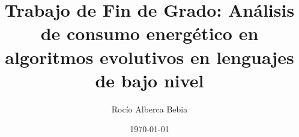 \documentclass[a4paper,12pt]{book}
\begin{document}
\title{Trabajo de Fin de Grado: Análisis de consumo energético en algoritmos evolutivos en lenguajes de bajo nivel}
\author{Rocío Alberca Bebia}
\date{\today}
\maketitle
\end{document}
